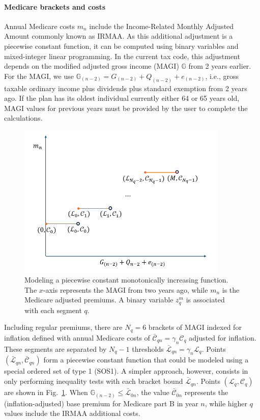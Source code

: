 \documentclass{report}[fleqn,11pt]
\begin{document}
\paragraph*{Medicare brackets and costs}
	Annual Medicare costs $m_n$ include the Income-Related Monthly Adjusted Amount
	commonly known as IRMAA.
	As this additional adjustment
	is a piecewise constant function,
        it can be computed using binary variables and mixed-integer linear
	programming. In the current tax code, this adjustment
	depends on the modified adjusted gross income (MAGI) $\mathbb{G}$ from 2 years earlier. For the
	MAGI, we use $\mathbb{G}_{(n-2)} = G_{(n-2)} + Q_{(n-2)} + e_{(n-2)}$,
	i.e., gross taxable ordinary income plus dividends
	plus standard exemption from 2 years ago.
	If the plan
        has its oldest individual currently either 64 or 65 years old, MAGI values for previous years
	must be provided by the user to complete the calculations.
	\begin{figure}[t]
	    \center\includegraphics[width=10cm]{piecewiseConstant.png}
	    \caption{\small Modeling a piecewise constant monotonically increasing function.
	    The $x$-axis represents the MAGI from two years ago, while $m_n$ is the Medicare adjusted premiums.
	    A binary variable $z_q^m$ is associated with each segment $q$.
	    \label{Fig:piecewise}}
	\end{figure}

	Including regular premiums, there are $N_q=6$ brackets
	of MAGI indexed for inflation defined with annual Medicare costs of
	$\bar{\mathcal{C}}_{qn} = \gamma_n\mathcal{C}_q$ adjusted for inflation.
        These segments are separated by $N_q -1$ thresholds
	$\bar{\mathcal{L}}_{qn} = \gamma_n\mathcal{L}_q$.
        Points $(\bar{\mathcal{L}}_{qn}, \bar{\mathcal{C}}_{qn})$ form a piecewise
	constant function that could be modeled using a special ordered set of type 1 (SOS1).
        A simpler approach, however, consists in only performing inequality tests with
        each bracket bound $\bar{\mathcal{L}}_{qn}$.
	Points $(\mathcal{L}_q, \mathcal{C}_q)$ are shown in Fig.~\ref{Fig:piecewise}.
        When $\mathbb{G}_{(n-2)} \leq \bar{\mathcal{L}}_{0n}$,
	the value $\bar{\mathcal{C}}_{0n}$
	represents the (inflation-adjusted) base premium for Medicare part B in year $n$, while
	higher $q$ values include the IRMAA additional costs.
\end{document}
